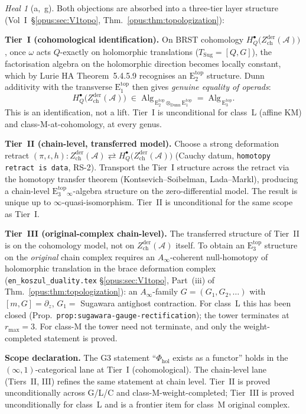 \documentclass{article}
\theoremstyle{definition}
\theoremstyle{remark}
\newtheorem{heal}[theorem]{Heal}
\newcommand{\Phihol}{\Phi_{\mathrm{hol}}}
\newcommand{\Zder}{Z^{\mathrm{der}}_{\mathrm{ch}}}
\newcommand{\Etop}[1]{\mathrm{E}_{#1}^{\mathrm{top}}}
\newcommand{\cA}{\mathcal{A}}
\begin{document}
\begin{heal}[a,~g]
\label{heal:cycle1}
Both objections are absorbed into a three-tier layer structure
(Vol~I~\S\ref*{opus:sec:V1topo},
Thm.~\ref*{opus:thm:topologization}):

\smallskip
\textbf{Tier~I (cohomological identification).} On BRST
cohomology $H^\bullet_Q\bigl(\Zder(\cA)\bigr)$, once $\omega$
acts $Q$-exactly on holomorphic translations
($T_{\mathrm{Sug}} = [Q, G]$), the factorisation algebra on the
holomorphic direction becomes locally constant, which by
Lurie HA Theorem~5.4.5.9 recognises an $\Etop{2}$ structure.
Dunn additivity with the transverse $\Etop{1}$ then gives
\emph{genuine equality of operads}:
\begin{equation}\label{eq:opus-tier-I}
  H^\bullet_Q\bigl(\Zder(\cA)\bigr)
  \;\in\; \mathrm{Alg}_{\,\Etop{2} \otimes_{\mathrm{Dunn}} \Etop{1}}
  \;=\; \mathrm{Alg}_{\,\Etop{3}}.
\end{equation}
This is an identification, not a lift. Tier~I is
unconditional for class~L (affine KM) and
class-M-at-cohomology, at every genus.

\smallskip
\textbf{Tier~II (chain-level, transferred model).} Choose a
strong deformation retract
$(\pi, \iota, h)\colon \Zder(\cA) \rightleftarrows
H^\bullet_Q\bigl(\Zder(\cA)\bigr)$ (Cauchy datum,
\texttt{homotopy retract is data}, RS-2). Transport the
Tier~I structure across the retract via the homotopy transfer
theorem (Kontsevich--Soibelman, Lada--Markl), producing a
chain-level $\Etop{3}_\infty$-algebra structure on the
zero-differential model. The result is unique up to
$\infty$-quasi-isomorphism. Tier~II is unconditional for the
same scope as Tier~I.

\smallskip
\textbf{Tier~III (original-complex chain-level).} The
transferred structure of Tier~II is on the cohomology model,
not on $\Zder(\cA)$ itself. To obtain an $\Etop{3}$
structure on the \emph{original} chain complex requires an
$A_\infty$-coherent null-homotopy of holomorphic translation
in the brace deformation complex
(\texttt{en\_koszul\_duality.tex} \S\ref*{opus:sec:V1topo},
Part~(iii) of Thm.~\ref*{opus:thm:topologization}): an
$A_\infty$-family $G = (G_1, G_2, \ldots)$ with
$[m, G] = \partial_z$, $G_1 =$ Sugawara antighost
contraction. For class~L this has been closed
(Prop.~\texttt{prop:sugawara-gauge-rectification}); the
tower terminates at $r_{\max} = 3$. For class-M the
tower need not terminate, and only the weight-completed
statement is proved.

\smallskip
\textbf{Scope declaration.} The G3 statement
``$\Phihol$ exists as a functor'' holds in the
$(\infty,1)$-categorical lane at Tier~I (cohomological). The
chain-level lane (Tiers~II, III) refines the same statement
at chain level. Tier~II is proved unconditionally across
G/L/C and class-M-weight-completed; Tier~III is proved
unconditionally for class~L and is a frontier item for
class~M original complex.


\end{heal}
\end{document}
